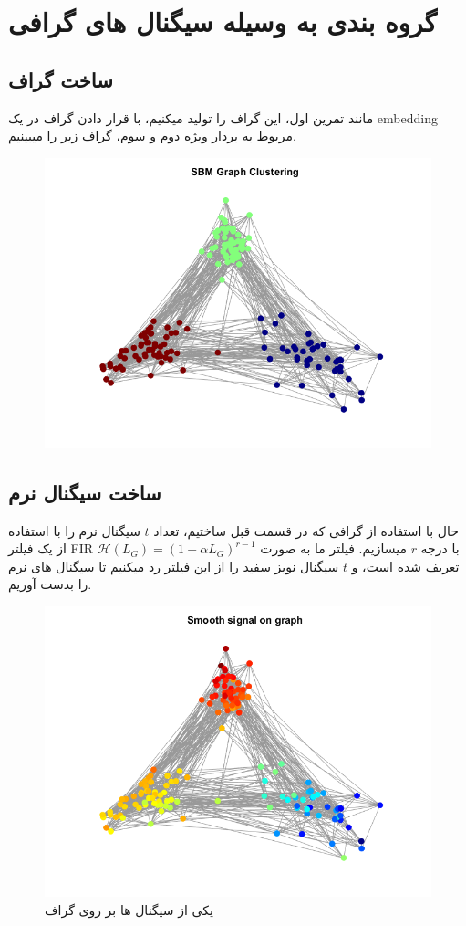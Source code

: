 \section{گروە بندی به وسیله سیگنال های گرافی}

\subsection{ساخت گراف}

مانند تمرین اول، این گراف را تولید میکنیم، با قرار دادن گراف در یک embedding مربوط به
بردار ویژه دوم و سوم، گراف زیر را میبینیم.

\begin{figure}[h!]
	\centering
	\includegraphics*[width=0.7\linewidth]{../results/Q2/orig_clusters.png}
	\vspace*{-2em}
\end{figure}

\subsection{ساخت سیگنال نرم}

حال با استفاده از گرافی که در قسمت قبل ساختیم، تعداد $t$ سیگنال نرم را با استفاده از یک فیلتر FIR با درجه $r$ میسازیم.
فیلتر ما به صورت $\mathcal{H}(L_G)=(1-\alpha L_G)^{r-1}$ تعریف شده است، و $t$ سیگنال نویز سفید را از این فیلتر رد میکنیم تا سیگنال های نرم را بدست آوریم.

\begin{figure}[h!]
	\centering
	\includegraphics*[width=0.7\linewidth]{../results/Q2/smooth_signal.png}
	\vspace*{-2em}
	\caption{
		یکی از سیگنال ها بر روی گراف
	}
	\label{fig:smooth_sig}
\end{figure}

